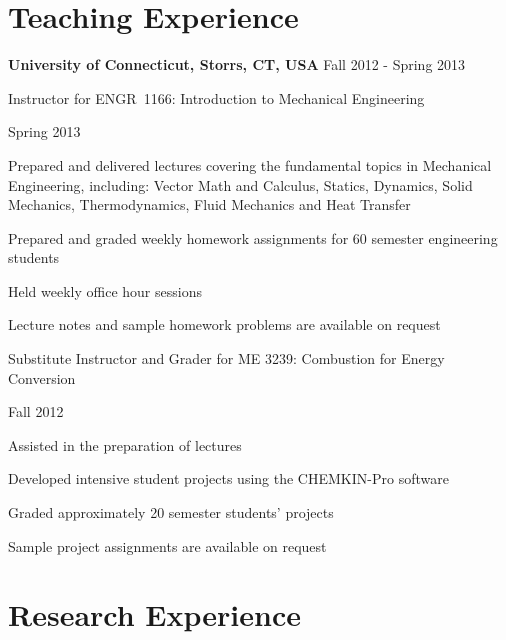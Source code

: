 \section{Teaching Experience}
\textbf{ University of Connecticut, Storrs, CT, USA} \hfill Fall 2012 - Spring 2013
\begin{outerlist}
    \item[] Instructor for ENGR~1166: Introduction to Mechanical Engineering
        \begin{innerlist}
            \item[] 
            \item Spring 2013
            \item Prepared and delivered lectures covering the fundamental topics in Mechanical Engineering, including: Vector Math and Calculus, Statics, Dynamics, Solid Mechanics, Thermodynamics, Fluid Mechanics and Heat Transfer
            \item Prepared and graded weekly homework assignments for 60  semester engineering students
            \item Held weekly office hour sessions
            \item[] Lecture notes and sample homework problems are available on request
        \end{innerlist}

        \halfblankline

   \item[] Substitute Instructor and Grader for ME 3239: Combustion for Energy Conversion
        \begin{innerlist}
            \item Fall 2012
            \item Assisted in the preparation of lectures
            \item Developed intensive student projects using the CHEMKIN-Pro software 
            \item Graded approximately 20  semester students' projects
            \item[] Sample project assignments are available on request
        \end{innerlist}

\end{outerlist}


\section{Research Experience}

